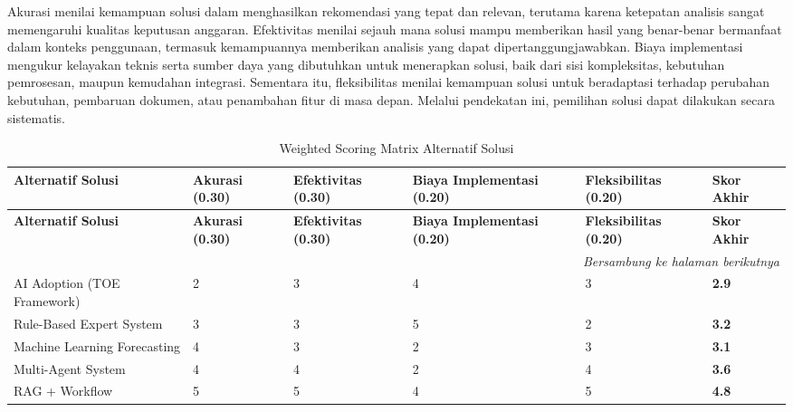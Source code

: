 Akurasi menilai kemampuan solusi dalam menghasilkan rekomendasi yang tepat dan relevan, terutama karena ketepatan analisis sangat memengaruhi kualitas keputusan anggaran. Efektivitas menilai sejauh mana solusi mampu memberikan hasil yang benar-benar bermanfaat dalam konteks penggunaan, termasuk kemampuannya memberikan analisis yang dapat dipertanggungjawabkan. Biaya implementasi mengukur kelayakan teknis serta sumber daya yang dibutuhkan untuk menerapkan solusi, baik dari sisi kompleksitas, kebutuhan pemrosesan, maupun kemudahan integrasi. Sementara itu, fleksibilitas menilai kemampuan solusi untuk beradaptasi terhadap perubahan kebutuhan, pembaruan dokumen, atau penambahan fitur di masa depan. Melalui pendekatan ini, pemilihan solusi dapat dilakukan secara sistematis.

\begin{longtable}{|p{3.5cm}|p{1.5cm}|p{2cm}|p{2cm}|p{2cm}|p{1cm}|}
\caption{Weighted Scoring Matrix Alternatif Solusi} \\
\hline
\textbf{Alternatif Solusi} & 
\textbf{Akurasi (0.30)} &
\textbf{Efektivitas (0.30)} &
\textbf{Biaya Implementasi (0.20)} &
\textbf{Fleksibilitas (0.20)} &
\textbf{Skor Akhir} \\
\hline
\endfirsthead

\hline
\textbf{Alternatif Solusi} & 
\textbf{Akurasi (0.30)} &
\textbf{Efektivitas (0.30)} &
\textbf{Biaya Implementasi (0.20)} &
\textbf{Fleksibilitas (0.20)} &
\textbf{Skor Akhir} \\
\hline
\endhead

\hline
\multicolumn{6}{r}{\textit{Bersambung ke halaman berikutnya}} \\
\endfoot

\hline
\endlastfoot

AI Adoption (TOE Framework)
& 2 & 3 & 4 & 3
& \textbf{2.9} \\ \hline

Rule-Based Expert System
& 3 & 3 & 5 & 2
& \textbf{3.2} \\ \hline

Machine Learning Forecasting
& 4 & 3 & 2 & 3
& \textbf{3.1} \\ \hline

Multi-Agent System 
& 4 & 4 & 2 & 4
& \textbf{3.6} \\ \hline

RAG + Workflow
& 5 & 5 & 4 & 5 
& \textbf{4.8} \\ \hline

\end{longtable}

